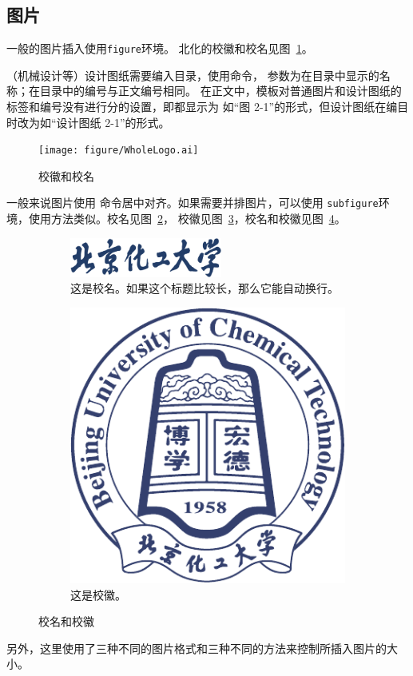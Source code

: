 \subsection{图片}\label{subsec:fig}
一般的图片插入使用\texttt{figure}环境。
北化的校徽和校名见图~\ref{fig:WholeLogo}。

（机械设计等）设计图纸需要编入目录，使用命令，
参数为在目录中显示的名称；在目录中的编号与正文编号相同。
在正文中，模板对普通图片和设计图纸的标签和编号没有进行分的设置，即都显示为
如“图 2-1”的形式，但设计图纸在编目时改为如“设计图纸 2-1”的形式。

\begin{figure}[H]
	\centering
	\texttt{[image: figure/WholeLogo.ai]}
	\caption{校徽和校名}
	\label{fig:WholeLogo}
\end{figure}

一般来说图片使用 命令居中对齐。如果需要并排图片，可以使用
\texttt{sub\-figure}环境，使用方法类似。校名见图~\ref{subfig:znname}，
校徽见图~\ref{subfig:logo}，校名和校徽见图~\ref{fig:wholelogo}。
\begin{figure}[H]
	\centering%
	\begin{subfigure}[b]{6cm}
		\includegraphics[width=5cm]{figure/ZNName.png}
		\caption{这是校名。如果这个标题比较长，那么它能自动换行。}\label{subfig:znname}
	\end{subfigure}
	\hspace{1cm}
	\begin{subfigure}[b]{2.5cm}
		\includegraphics[scale=0.4]{figure/Logo.pdf}
		\caption{这是校徽。}\label{subfig:logo}
	\end{subfigure}
	\caption{校名和校徽}\label{fig:wholelogo}
\end{figure}
另外，这里使用了三种不同的图片格式和三种不同的方法来控制所插入图片的大小。

